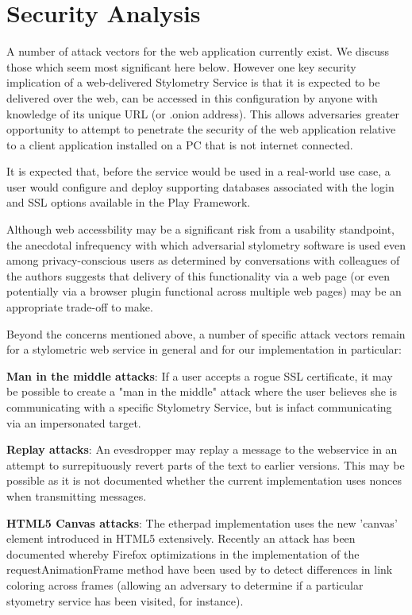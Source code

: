 \documentclass[letterpaper]{article}
\begin{document}
\section{Security Analysis}

A number of attack vectors for the web application currently exist. We
discuss those which seem most significant here below. However one key
security implication of a web-delivered Stylometry Service is that it
is expected to be delivered over the web, can be accessed in this
configuration by anyone with knowledge of its unique URL (or .onion
address). This allows adversaries greater opportunity to attempt to
penetrate the security of the web application relative to a client
application installed on a PC that is not internet connected.

It is expected that, before the service would be used in a real-world
use case, a user would configure and deploy supporting databases
associated with the login and SSL options available in the
Play Framework.

Although web accessbility may be a significant risk from a usability
standpoint, the anecdotal infrequency with which adversarial
stylometry software is used even among privacy-conscious users as
determined by conversations with colleagues of the authors
suggests that delivery of this functionality via a web page (or even
potentially via a browser plugin functional across multiple web pages)
may be an appropriate trade-off to make.

Beyond the concerns mentioned above, a number of specific attack
vectors remain for a stylometric web service in general and for our
implementation in particular:

{\bf Man in the middle attacks}: If a user accepts a rogue SSL
certificate, it may be possible to create a "man in the middle" attack
where the user believes she is communicating with a specific
Stylometry Service, but is infact communicating via an impersonated
target.

{\bf Replay attacks}: An evesdropper may replay a message to the
webservice in an attempt to surrepituously revert parts of the text to
earlier versions. This may be possible as it is not documented whether
the current implementation uses nonces when transmitting messages.

{\bf HTML5 Canvas attacks}: The etherpad implementation uses the new
'canvas' element introduced in HTML5 extensively. Recently an attack
has been documented \cite{BrowserTiming} whereby Firefox optimizations
in the implementation of the requestAnimationFrame method have been
used by to detect differences in link coloring across frames (allowing
an adversary to determine if a particular styometry service has been
visited, for instance).
\end{document}
